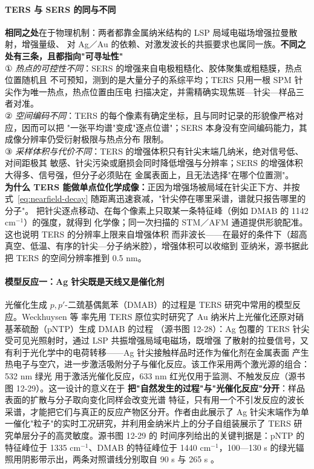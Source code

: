 \paragraph{TERS 与 SERS 的同与不同}
\textbf{相同之处}在于物理机制：两者都靠金属纳米结构的 LSP 局域电磁场增强拉曼散射，增强量级、
对 Ag／Au 的依赖、对激发波长的共振要求也属同一族。\textbf{不同之处有三条，且都指向"可寻址性"}\\
① \emph{热点的可控性不同}：SERS 的增强来自电极粗糙化、胶体聚集或粗糙膜，热点位置随机且
不可预知，测到的是大量分子的系综平均；TERS 只用一根 SPM 针尖作为唯一热点，热点位置由压电
扫描决定，并需精确实现焦斑—针尖—样品三者对准。\\
② \emph{空间编码不同}：TERS 的每个像素有确定坐标，且与同时记录的形貌像严格对应，因而可以把
"一张平均谱"变成"逐点位谱"；SERS 本身没有空间编码能力，其成像分辨率仍受衍射极限与热点分布
限制。\\
③ \emph{采样体积与代价不同}：TERS 的增强体积只有针尖末端几纳米，绝对信号低、对间距极其
敏感、针尖污染或磨损会同时降低增强与分辨率；SERS 的增强体积大得多、信号强，但分子必须贴在
金属表面上，且无法选择"在哪个位置测"。\\
\textbf{为什么 TERS 能做单点位化学成像：}正因为增强场被局域在针尖正下方、并按
式~\eqref{eq:nearfield-decay} 随距离迅速衰减，"针尖停在哪里采谱，谱就只报告哪里的分子"。
把针尖逐点移动、在每个像素上只取某一条特征峰（例如 DMAB 的 1142 cm$^{-1}$）的强度，就得到
化学像；同一次扫描的 STM／AFM 通道提供形貌配准。这也说明 TERS 的分辨率上限来自增强体积
而非波长——在最好的条件下（超高真空、低温、有序的针尖—分子纳米腔），增强体积可以收缩到
亚纳米，源书据此把 TERS 的空间分辨率推到 0.5 nm。

\paragraph{模型反应一：Ag 针尖既是天线又是催化剂}
光催化生成 $p,p'$-二巯基偶氮苯（DMAB）的过程是 TERS 研究中常用的模型反应。Weckhuysen 等
率先用 TERS 原位实时研究了 Au 纳米片上光催化还原对硝基苯硫酚（pNTP）生成 DMAB 的过程
（源书图 12-28）：Ag 包覆的 TERS 针尖受可见光照射时，通过 LSP 共振增强局域电磁场，既增强
了散射的拉曼信号，又有利于光化学中的电荷转移——Ag 针尖接触样品时还作为催化剂在金属表面
产生热电子与空穴，进一步激活吸附分子与催化反应。该工作采用两个激光源的组合：532 nm 绿光
用于激活光催化反应，633 nm 红光仅用于监测、不触发反应（源书图 12-29）。这一设计的意义在于
\textbf{把"自然发生的过程"与"光催化反应"分开}：样品表面的扩散与分子取向变化同样会改变光谱
特征，只有用一个不引发反应的波长采谱，才能把它们与真正的反应产物区分开。作者由此展示了
Ag 针尖末端作为单一催化"粒子"的实时工况研究，并利用金纳米片上的分子自组装展示了 TERS
研究单层分子的高灵敏度。源书图 12-29 的
时间序列给出的关键判据是：pNTP 的特征峰位于 1335 cm$^{-1}$、DMAB 的特征峰位于
1440 cm$^{-1}$，100—130 s 的绿光辐照用阴影带示出，两条对照谱线分别取自 90 s 与 265 s
。

